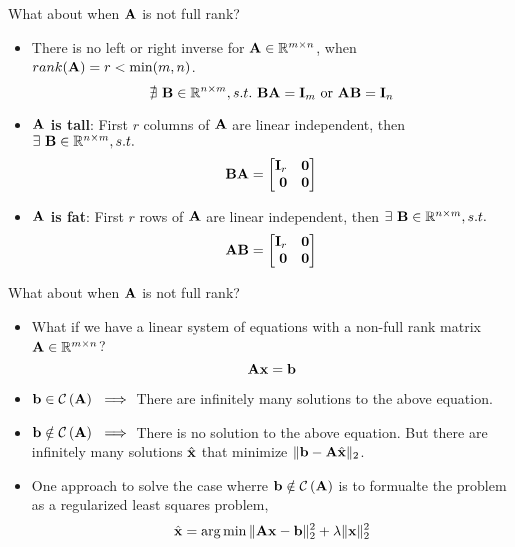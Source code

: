 \documentclass[aspectratio=169]{beamer}
\let\olditem\item
\renewcommand{\item}{\setlength{\itemsep}{\fill}\olditem}
\def\mf{\ensuremath\mathbf}
\def\mb{\ensuremath\mathbb}
\def\mc{\ensuremath\mathcal}
\def\lp{\ensuremath\left(}
\def\rp{\ensuremath\right)}
\def\bmx{\ensuremath\begin{bmatrix*}[r]}
\def\emx{\ensuremath\end{bmatrix*}}
\begin{document}
\begin{frame}[t]{What about when $\mf{A}$ is not full rank?}
\begin{itemize}
    \item There is no left or right inverse for $\mf{A} \in \mb{R}^{m \times n}$, when $rank(\mf{A}) = r < \min(m, n)$.
    \[ \nexists \,\, \mf{B} \in \mb{R}^{n \times m}, s.t. \,\, \mf{B}\mf{A} = \mf{I}_m \,\, \text{or} \,\, \mf{AB} = \mf{I}_n \]
    
    \item \textbf{$\mf{A}$ is tall}: First $r$ columns of $\mf{A}$ are linear independent, then  $\exists \,\, \mf{B} \in \mb{R}^{n \times m}, s.t.$
    \[\mf{BA} = \bmx \mf{I}_r & \mf{0} \\ \mf{0} & \mf{0} \emx \]
    
    \item \textbf{$\mf{A}$ is fat}: First $r$ rows of $\mf{A}$ are linear independent, then  $\exists \,\, \mf{B} \in \mb{R}^{n \times m}, s.t.$
    \[\mf{AB} = \bmx \mf{I}_r & \mf{0} \\ \mf{0} & \mf{0} \emx \]
    
\end{itemize}
\end{frame}


\begin{frame}[t]{What about when $\mf{A}$ is not full rank?}
\begin{itemize}
    \item What if we have a linear system of equations with a non-full rank matrix $\mf{A} \in \mb{R}^{m \times n}$?
    \[ \mf{Ax} = \mf{b} \]
    
    \item $\mf{b} \in \mathcal{C}\lp \mf{A} \rp \,\, \implies $ There are infinitely many solutions to the above equation.

    \item $\mf{b} \notin \mathcal{C}\lp \mf{A} \rp \,\, \implies $ There is no solution to the above equation. But there are infinitely many solutions $\hat{\mf{x}}$ that minimize $\Vert \mf{b} - \mf{A}\hat{\mf{x}} \Vert_2$.
    
    \item One approach to solve the case wherre $\mf{b} \notin \mc{C}\lp \mf{A} \rp$ is to formualte the problem as a regularized least squares problem,
    \[ \hat{\mf{x}} = \arg \min \Vert \mf{Ax} - \mf{b}\Vert_2^2 + \lambda \Vert \mf{x} \Vert_2^2 \]
\end{itemize}
\end{frame}
\end{document}
